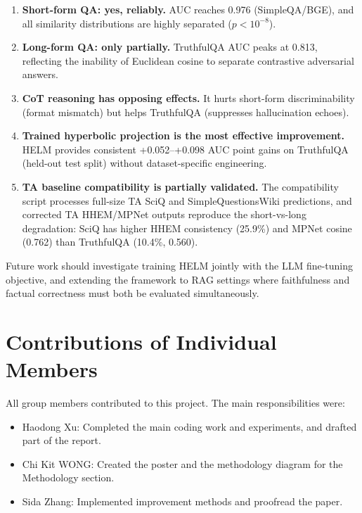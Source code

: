 \documentclass{article}
\begin{document}
\begin{enumerate}[nosep]
  \item \textbf{Short-form QA: yes, reliably.}  AUC reaches 0.976 (SimpleQA/BGE),
        and all similarity distributions are highly separated ($p < 10^{-8}$).
  \item \textbf{Long-form QA: only partially.}  TruthfulQA AUC peaks at 0.813,
        reflecting the inability of Euclidean cosine to separate contrastive
        adversarial answers.
  \item \textbf{CoT reasoning has opposing effects.}  It hurts short-form
        discriminability (format mismatch) but helps TruthfulQA (suppresses
        hallucination echoes).
  \item \textbf{Trained hyperbolic projection is the most effective improvement.}
        HELM provides consistent +0.052--+0.098 AUC point gains on TruthfulQA
        (held-out test split) without dataset-specific engineering.
  \item \textbf{TA baseline compatibility is partially validated.}  The
        compatibility script processes full-size TA SciQ and SimpleQuestionsWiki
        predictions, and corrected TA HHEM/MPNet outputs reproduce the
        short-vs-long degradation: SciQ has higher HHEM consistency (25.9\%)
        and MPNet cosine (0.762) than TruthfulQA (10.4\%, 0.560).
\end{enumerate}

Future work should investigate training HELM jointly with the LLM fine-tuning
objective, and extending the framework to RAG settings where faithfulness and
factual correctness must both be evaluated simultaneously.

\section*{Contributions of Individual Members}

All group members contributed to this project. The main responsibilities were:

\begin{itemize}[nosep]
  \item Haodong Xu: Completed the main coding work and experiments, and drafted part of the report.
  \item Chi Kit WONG: Created the poster and the methodology diagram for the Methodology section.
  \item Sida Zhang: Implemented improvement methods and proofread the paper.
\end{itemize}
\end{document}
